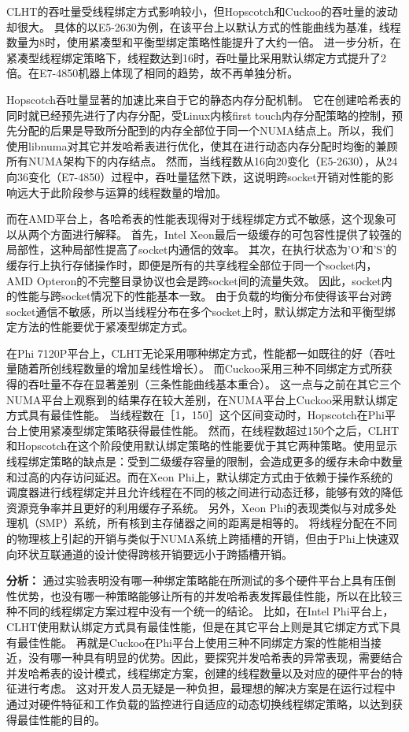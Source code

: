 CLHT的吞吐量受线程绑定方式影响较小，但Hopscotch和Cuckoo的吞吐量的波动却很大。
具体的以E5-2630为例，在该平台上以默认方式的性能曲线为基准，线程数量为8时，使用紧凑型和平衡型绑定策略性能提升了大约一倍。
进一步分析，在紧凑型线程绑定策略下，线程数达到16时，吞吐量比采用默认绑定方式提升了2倍。在E7-4850机器上体现了相同的趋势，故不再单独分析。

Hopscotch吞吐量显著的加速比来自于它的静态内存分配机制。
它在创建哈希表的同时就已经预先进行了内存分配，受Linux内核first 
touch内存分配策略的控制，预先分配的后果是导致所分配到的内存全部位于同一个NUMA结点上。所以，我们使用libnuma对其它并发哈希表进行优化，使其在进行动态内存分配时均衡的兼顾所有NUMA架构下的内存结点。
然而，当线程数从16向20变化（E5-2630），从24向36变化（E7-4850）过程中，吞吐量猛然下跌，这说明跨socket开销对性能的影响远大于此阶段参与运算的线程数量的增加。

而在AMD平台上，各哈希表的性能表现得对于线程绑定方式不敏感，这个现象可以从两个方面进行解释。
首先，Intel Xeon最后一级缓存的可包容性提供了较强的局部性，这种局部性提高了socket内通信的效率。
其次，在执行状态为’O’和’S’的缓存行上执行存储操作时，即便是所有的共享线程全部位于同一个socket内，AMD Opteron的不完整目录协议也会是跨socket间的流量失效。
因此，socket内的性能与跨socket情况下的性能基本一致。
由于负载的均衡分布使得该平台对跨socket通信不敏感，所以当线程分布在多个socket上时，默认绑定方法和平衡型绑定方法的性能要优于紧凑型绑定方式。

在Phi 7120P平台上，CLHT无论采用哪种绑定方式，性能都一如既往的好（吞吐量随着所创线程数量的增加呈线性增长）。
而Cuckoo采用三种不同绑定方式所获得的吞吐量不存在显著差别（三条性能曲线基本重合）。
这一点与之前在其它三个NUMA平台上观察到的结果存在较大差别，在NUMA平台上Cuckoo采用默认绑定方式具有最佳性能。
当线程数在［1，150］这个区间变动时，Hopscotch在Phi平台上使用紧凑型绑定策略获得最佳性能。
然而，在线程数超过150个之后，CLHT 和Hopscotch在这个阶段使用默认绑定策略的性能要优于其它两种策略。使用显示线程绑定策略的缺点是：受到二级缓存容量的限制，会造成更多的缓存未命中数量和过高的内存访问延迟。而在Xeon Phi上，默认绑定方式由于依赖于操作系统的调度器进行线程绑定并且允许线程在不同的核之间进行动态迁移，能够有效的降低资源竞争率并且更好的利用缓存子系统。
另外，Xeon Phi的表现类似与对成多处理机（SMP）系统，所有核到主存储器之间的距离是相等的。
将线程分配在不同的物理核上引起的开销与类似于NUMA系统上跨插槽的开销，但由于Phi上快速双向环状互联通道的设计使得跨核开销要远小于跨插槽开销。

\textbf{分析：} 通过实验表明没有哪一种绑定策略能在所测试的多个硬件平台上具有压倒性优势，也没有哪一种策略能够让所有的并发哈希表发挥最佳性能，所以在比较三种不同的线程绑定方案过程中没有一个统一的结论。
比如，在Intel Phi平台上，CLHT使用默认绑定方式具有最佳性能，但是在其它平台上则是其它绑定方式下具有最佳性能。
再就是Cuckoo在Phi平台上使用三种不同绑定方案的性能相当接近，没有哪一种具有明显的优势。因此，要探究并发哈希表的异常表现，需要结合并发哈希表的设计模式，线程绑定方案，创建的线程数量以及对应的硬件平台的特征进行考虑。
这对开发人员无疑是一种负担，最理想的解决方案是在运行过程中通过对硬件特征和工作负载的监控进行自适应的动态切换线程绑定策略，以达到获得最佳性能的目的。

